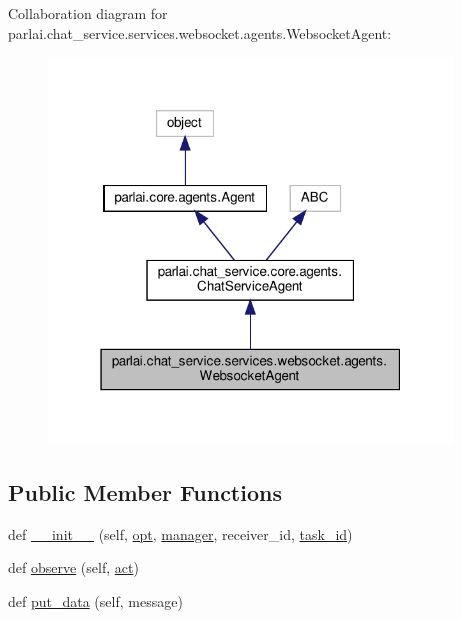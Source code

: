 Collaboration diagram for parlai.\+chat\+\_\+service.\+services.\+websocket.\+agents.\+Websocket\+Agent\+:
\nopagebreak
\begin{figure}[H]
\begin{center}
\leavevmode
\includegraphics[width=304pt]{classparlai_1_1chat__service_1_1services_1_1websocket_1_1agents_1_1WebsocketAgent__coll__graph}
\end{center}
\end{figure}
\subsection*{Public Member Functions}
\begin{DoxyCompactItemize}
\item 
def \hyperlink{classparlai_1_1chat__service_1_1services_1_1websocket_1_1agents_1_1WebsocketAgent_a128d5ee9aaa2861274d95778b75dda16}{\+\_\+\+\_\+init\+\_\+\+\_\+} (self, \hyperlink{classparlai_1_1core_1_1agents_1_1Agent_ab3b45d2754244608c75d4068b90cd051}{opt}, \hyperlink{classparlai_1_1chat__service_1_1core_1_1agents_1_1ChatServiceAgent_a8216a688db46e2aa7cdd023016ecf27c}{manager}, receiver\+\_\+id, \hyperlink{classparlai_1_1chat__service_1_1core_1_1agents_1_1ChatServiceAgent_a1f1f978765ae81ca5ec8d04d14575386}{task\+\_\+id})
\item 
def \hyperlink{classparlai_1_1chat__service_1_1services_1_1websocket_1_1agents_1_1WebsocketAgent_aae41aaeb0af93fb30a11e731167c596c}{observe} (self, \hyperlink{classparlai_1_1chat__service_1_1core_1_1agents_1_1ChatServiceAgent_afbb942bd61c840d55354e5cfea6a1f4d}{act})
\item 
def \hyperlink{classparlai_1_1chat__service_1_1services_1_1websocket_1_1agents_1_1WebsocketAgent_a8e6bb97a0b0996be55dd7aacedc62dff}{put\+\_\+data} (self, message)
\end{DoxyCompactItemize}
